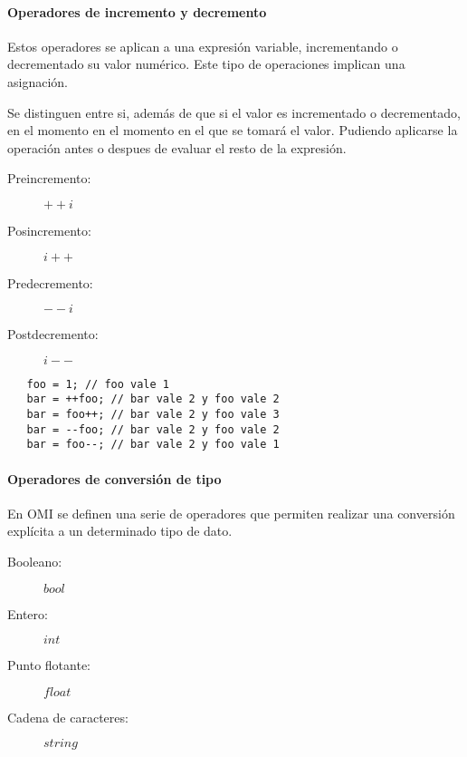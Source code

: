 \paragraph{Operadores de incremento y decremento} \label{sec:op_inc}
Estos operadores se aplican a una expresión variable, incrementando o decrementado su valor
numérico. Este tipo de operaciones implican una asignación. 

Se distinguen entre si, además de que si el valor es incrementado o decrementado, en el momento en el momento
en el que se tomará el valor. Pudiendo aplicarse la operación antes o despues de evaluar el resto de la expresión.

\begin{description}
\item [Preincremento:] $++i$
\item [Posincremento:] $i++$
\item [Predecremento:] $--i$
\item [Postdecremento:] $i--$
\end{description} 


 \begin{lstlisting}
   foo = 1; // foo vale 1
   bar = ++foo; // bar vale 2 y foo vale 2
   bar = foo++; // bar vale 2 y foo vale 3
   bar = --foo; // bar vale 2 y foo vale 2
   bar = foo--; // bar vale 2 y foo vale 1
\end{lstlisting} 



\paragraph{Operadores de conversión de tipo} \label{sec:op_type}
En OMI se definen una serie de operadores que permiten realizar una conversión explícita a un determinado tipo de dato.

\begin{description}
\item [Booleano:] $bool$
\item [Entero:] $int$
\item [Punto flotante:] $float$
\item [Cadena de caracteres:] $string$
\end{description} 

